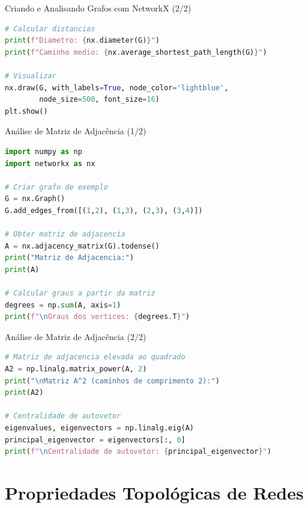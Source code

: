 \begin{frame}[fragile, shrink=5]{Criando e Analisando Grafos com NetworkX (2/2)}
\begin{lstlisting}[language=Python, basicstyle=\ttfamily\footnotesize]
# Calcular distancias
print(f"Diametro: {nx.diameter(G)}")
print(f"Caminho medio: {nx.average_shortest_path_length(G)}")

# Visualizar
nx.draw(G, with_labels=True, node_color='lightblue',
        node_size=500, font_size=16)
plt.show()
\end{lstlisting}
\end{frame}

\begin{frame}[fragile, shrink=10]{Análise de Matriz de Adjacência (1/2)}
\begin{lstlisting}[language=Python, basicstyle=\ttfamily\footnotesize]
import numpy as np
import networkx as nx

# Criar grafo de exemplo
G = nx.Graph()
G.add_edges_from([(1,2), (1,3), (2,3), (3,4)])

# Obter matriz de adjacencia
A = nx.adjacency_matrix(G).todense()
print("Matriz de Adjacencia:")
print(A)

# Calcular graus a partir da matriz
degrees = np.sum(A, axis=1)
print(f"\nGraus dos vertices: {degrees.T}")
\end{lstlisting}
\end{frame}

\begin{frame}[fragile, shrink=10]{Análise de Matriz de Adjacência (2/2)}
\begin{lstlisting}[language=Python, basicstyle=\ttfamily\footnotesize]
# Matriz de adjacencia elevada ao quadrado
A2 = np.linalg.matrix_power(A, 2)
print("\nMatriz A^2 (caminhos de comprimento 2):")
print(A2)

# Centralidade de autovetor
eigenvalues, eigenvectors = np.linalg.eig(A)
principal_eigenvector = eigenvectors[:, 0]
print(f"\nCentralidade de autovetor: {principal_eigenvector}")
\end{lstlisting}
\end{frame}

\section{Propriedades Topológicas de Redes}

